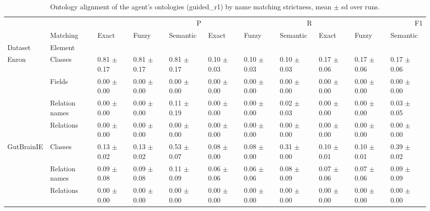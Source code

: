 \begin{table}
\caption{Ontology alignment of the agent's ontologies (guided_r1) by name matching strictness, mean $\pm$ sd over runs.}
\label{tab:onto_ontology_guided_r1}
\begin{tabular}{lllllllllll}
\toprule
 &  & \multicolumn{3}{r}{P} & \multicolumn{3}{r}{R} & \multicolumn{3}{r}{F1} \\
 & Matching & Exact & Fuzzy & Semantic & Exact & Fuzzy & Semantic & Exact & Fuzzy & Semantic \\
Dataset & Element &  &  &  &  &  &  &  &  &  \\
\midrule
\multirow[t]{4}{*}{Enron} & Classes & 0.81 $\pm$ 0.17 & 0.81 $\pm$ 0.17 & 0.81 $\pm$ 0.17 & 0.10 $\pm$ 0.03 & 0.10 $\pm$ 0.03 & 0.10 $\pm$ 0.03 & 0.17 $\pm$ 0.06 & 0.17 $\pm$ 0.06 & 0.17 $\pm$ 0.06 \\
 & Fields & 0.00 $\pm$ 0.00 & 0.00 $\pm$ 0.00 & 0.00 $\pm$ 0.00 & 0.00 $\pm$ 0.00 & 0.00 $\pm$ 0.00 & 0.00 $\pm$ 0.00 & 0.00 $\pm$ 0.00 & 0.00 $\pm$ 0.00 & 0.00 $\pm$ 0.00 \\
 & Relation names & 0.00 $\pm$ 0.00 & 0.00 $\pm$ 0.00 & 0.11 $\pm$ 0.19 & 0.00 $\pm$ 0.00 & 0.00 $\pm$ 0.00 & 0.02 $\pm$ 0.03 & 0.00 $\pm$ 0.00 & 0.00 $\pm$ 0.00 & 0.03 $\pm$ 0.05 \\
 & Relations & 0.00 $\pm$ 0.00 & 0.00 $\pm$ 0.00 & 0.00 $\pm$ 0.00 & 0.00 $\pm$ 0.00 & 0.00 $\pm$ 0.00 & 0.00 $\pm$ 0.00 & 0.00 $\pm$ 0.00 & 0.00 $\pm$ 0.00 & 0.00 $\pm$ 0.00 \\
\cline{1-11}
\multirow[t]{3}{*}{GutBrainIE} & Classes & 0.13 $\pm$ 0.02 & 0.13 $\pm$ 0.02 & 0.53 $\pm$ 0.07 & 0.08 $\pm$ 0.00 & 0.08 $\pm$ 0.00 & 0.31 $\pm$ 0.00 & 0.10 $\pm$ 0.01 & 0.10 $\pm$ 0.01 & 0.39 $\pm$ 0.02 \\
 & Relation names & 0.09 $\pm$ 0.08 & 0.09 $\pm$ 0.08 & 0.11 $\pm$ 0.09 & 0.06 $\pm$ 0.06 & 0.06 $\pm$ 0.06 & 0.08 $\pm$ 0.09 & 0.07 $\pm$ 0.06 & 0.07 $\pm$ 0.06 & 0.09 $\pm$ 0.09 \\
 & Relations & 0.00 $\pm$ 0.00 & 0.00 $\pm$ 0.00 & 0.00 $\pm$ 0.00 & 0.00 $\pm$ 0.00 & 0.00 $\pm$ 0.00 & 0.00 $\pm$ 0.00 & 0.00 $\pm$ 0.00 & 0.00 $\pm$ 0.00 & 0.00 $\pm$ 0.00 \\
\cline{1-11}
\bottomrule
\end{tabular}
\end{table}

